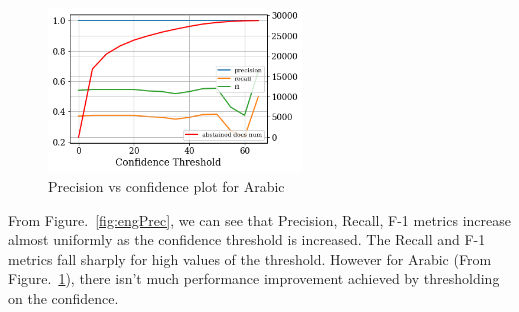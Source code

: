 \begin{figure}
    \centering
    \includegraphics[width=0.6\textwidth]{figures/arabic_precConf.png}
    \caption{Precision vs confidence plot for Arabic}
    \label{fig:arPrec}
\end{figure}

From Figure.~\ref{fig:engPrec}, we can see that Precision, Recall, F-1 metrics increase almost uniformly as the confidence threshold is increased. The Recall and F-1 metrics fall sharply for high values of the threshold.
However for Arabic (From Figure.~\ref{fig:arPrec}), there isn’t much performance improvement achieved by thresholding on the confidence.

